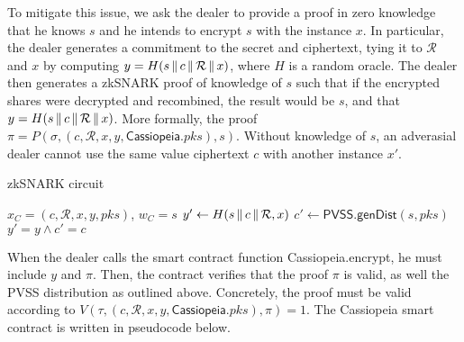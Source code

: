 To mitigate this issue, we ask the dealer to provide a proof in zero knowledge that he knows $s$ and he intends to encrypt $s$ with the instance $x$.
In particular, the dealer generates a commitment to the secret and ciphertext, tying it to $\mathcal{R}$ and $x$ by computing $y = H(s \,\|\, c \,\|\, \mathcal{R} \,\|\, x)$, where $H$ is a random oracle.
The dealer then generates a zkSNARK proof of knowledge of $s$ such that if the encrypted shares were decrypted and recombined, the result would be $s$, and that $y = H(s \,\|\, c \,\|\, \mathcal{R} \,\|\, x)$.
More formally, the proof $\pi = P(\sigma, (c, \mathcal{R}, x, y, \textsf{Cassiopeia}.pks), s)$.
Without knowledge of $s$, an adverasial dealer cannot use the same value ciphertext $c$ with another instance $x'$.

\begin{algorithm}
    \caption{zkSNARK circuit}
    \label{alg:snark_circuit}
    \begin{algorithmic}[1]
        \Require $x_C = (c, \mathcal{R}, x, y, pks)$, $w_C = s$
        \State $y' \gets H(s \,\|\, c \,\|\, \mathcal{R}, x)$
        \State $c' \gets \textsf{PVSS.genDist}(s, pks)$
        \State \Return $y' = y \land c' = c$
    \end{algorithmic}
\end{algorithm}

When the dealer calls the smart contract function \textsf{Cassiopeia.encrypt}, he must include $y$ and $\pi$.
Then, the contract verifies that the proof $\pi$ is valid, as well the PVSS distribution as outlined above.
Concretely, the proof must be valid according to $V(\tau, (c, \mathcal{R}, x, y, \textsf{Cassiopeia}.pks), \pi) = 1$.
The Cassiopeia smart contract is written in pseudocode below.

